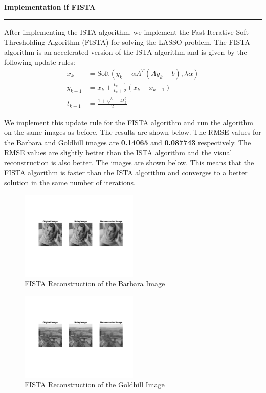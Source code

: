 \documentclass[a4paper,12pt]{article}
\newenvironment{solution}[2][]{%
    \begin{mdframed}[linecolor=blue!70!black, linewidth=2pt, roundcorner=10pt, backgroundcolor=yellow!10!white, skipabove=12pt, skipbelow=12pt]%
        \textbf{\large #2}
        \par\noindent\rule{\textwidth}{0.4pt}
}{
    \end{mdframed}
}
\begin{document}
\begin{solution}{Implementation if FISTA}
  After implementing the ISTA algorithm, we implement the Fast Iterative Soft Thresholding Algorithm (FISTA) for solving the LASSO problem. The FISTA algorithm is an accelerated version of the ISTA algorithm and is given by the following update rules:
  \begin{align}
    x_k &= \text{Soft}(y_k - \alpha A^T(Ay_k - b), \lambda \alpha) \\
    y_{k+1} &= x_k + \frac{t_k-1}{t_k+2} (x_k - x_{k-1}) \\
    t_{k+1} &= \displaystyle\frac{1 + \sqrt{1 + 4t_k^2}}{2}
  \end{align}

  \noindent We implement this update rule for the FISTA algorithm and run the algorithm on the same images as before. The results are shown below. The RMSE values for the Barbara and Goldhill images are \textbf{0.14065} and \textbf{0.087743} respectively. The RMSE values are slightly better than the ISTA algorithm and the visual reconstruction is also better. The images are shown below. This means that the FISTA algorithm is faster than the ISTA algorithm and converges to a better solution in the same number of iterations.

\end{solution}

\begin{figure}[!htbp]
  \centering
  \includegraphics[width=0.5\textwidth]{../FISTA_Barbara.png}
  \caption{FISTA Reconstruction of the Barbara Image}
\end{figure}

\begin{figure}[!htbp]
  \centering
  \includegraphics[width=0.5\textwidth]{../FISTA_Goldhill.png}
  \caption{FISTA Reconstruction of the Goldhill Image}
\end{figure}
\end{document}
